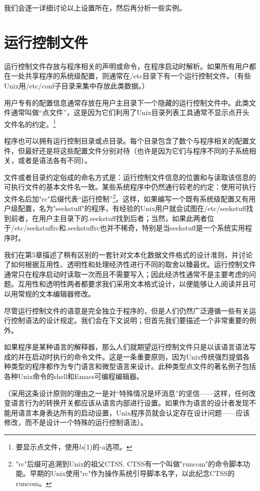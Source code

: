 \documentclass[12pt,oneside]{book}
\begin{document}
\begin{common-format}
我们会逐一详细讨论以上设置所在，然后再分析一些实例。

\section{运行控制文件}
运行控制文件存放与程序相关的声明或命令，在程序启动时解析。如果所有用户都在一处共享程序的系统级配置，则通常在/etc目录下有一个运行控制文件。（有些Unix用/etc/conf子目录来集中存放此类数据。）

用户专有的配置信息通常存放在用户主目录下一个隐藏的运行控制文件中。此类文件通常叫做“点文件”，这是因为它们利用了Unix目录列表工具通常不显示点开头文件名的约定。\footnote{要显示点文件，使用\textit{ls}(1)的-a选项。}

程序也可以拥有运行控制目录或点目录。每个目录包含了数个与程序相关的配置文件，但最好还是将这些配置文件分别对待（也许是因为它们与程序不同的子系统相关，或者是语法各有不同）。

文件或者目录约定俗成的命名方式是：运行控制文件信息的位置和与读取该信息的可执行文件的基本文件名一致。某些系统程序中仍然通行较老的约定：使用可执行文件名后加"rc"后缀代表“运行控制”\footnote{"rc"后缀可追溯到Unix的祖父CTSS. CTSS有一个叫做"runcom"的命令脚本功能。早期的Unix使用"rc"作为操作系统引导脚本名字，以此纪念CTSS的runcom。}。这样，如果编写一个既有系统级配置又有用户级配置，名为"seekstuff"的程序，有经验的Unix用户就会试图在/etc/seekstuff找到前者，在用户主目录下的.seekstuff找到后者；当然，如果此两者位于/etc/seekstuffrc和.seekstuffrc也并不稀奇，特别是当seekstuff是一个系统实用程序时。

我们在第5章描述了稍有区别的一套针对文本化数据文件格式的设计准则，并讨论了如何根据互用性、透明性和处理经济性进行不同的取舍以臻最优。运行控制文件通常只在程序启动时读取一次而且不需要写入；因此经济性通常不是主要考虑的问题。互用性和透明性两者都要求我们采用文本格式设计，以便能够让人阅读并且可以用常规的文本编辑器修改。

尽管运行控制文件的语意是完全独立于程序的，但是人们仍然广泛遵循一些有关运行控制语法的设计规定。我们会在下文说明；但首先我们要描述一个非常重要的例外。

如果程序是某种语言的解释器，那么人们就期望运行控制文件只是以该语言语法写成的并在启动时执行的命令文件。这是一条重要原则，因为Unix传统强烈提倡各种类型的程序都作为专门语言和微型语言来设计。此种类型点文件的著名例子包括各种Unix命令的shell和Emacs可编程编辑器。

（采用这条设计原则的理由之一是对“特殊情况是坏消息”的坚信——这样，任何改变语言行为的转换开关都应该从语言内部进行设置。如果作为语言的设计者发现不能用语言本身表达所有的启动设置，Unix程序员就会认定存在设计问题——应该修改，而不是设计一个特殊的运行控制语法）。


\end{common-format}
\end{document}
